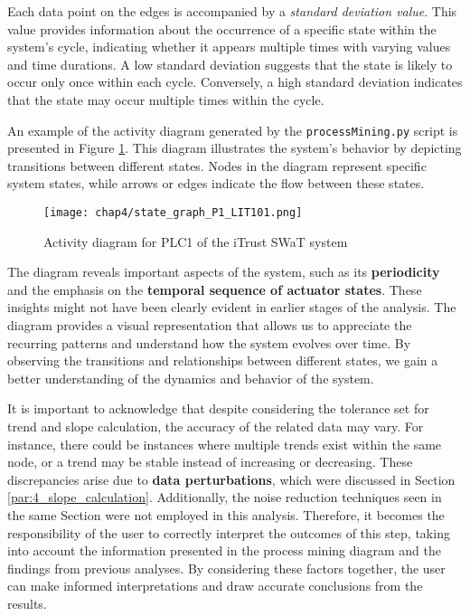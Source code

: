 Each data point on the edges is accompanied by a \textit{standard deviation value}. This value provides information about the occurrence of a specific state within the system's cycle, indicating whether it appears multiple times with varying values and time durations. A low standard deviation suggests that the state is likely to occur only once within each cycle. Conversely, a high standard deviation indicates that the state may occur multiple times within the cycle.

\bigskip
An example of the activity diagram generated by the \texttt{processMining.py} script is presented in Figure \ref{fig:4_process_mining_graph}. This diagram illustrates the system's behavior by depicting transitions between different states. Nodes in the diagram represent specific system states, while arrows or edges indicate the flow between these states.

\begin{figure}[ht]
	\centering
	\texttt{[image: chap4/state\_graph\_P1\_LIT101.png]}
	\caption{Activity diagram for PLC1 of the iTrust SWaT system}
	\label{fig:4_process_mining_graph}
\end{figure}

\noindent The diagram reveals important aspects of the system, such as its \textbf{periodicity} and the emphasis on the \textbf{temporal sequence of actuator states}. These insights might not have been clearly evident in earlier stages of the analysis. The diagram provides a visual representation that allows us to appreciate the recurring patterns and understand how the system evolves over time. By observing the transitions and relationships between different states, we gain a better understanding of the dynamics and behavior of the system.

\bigskip
It is important to acknowledge that despite considering the tolerance set for trend and slope calculation, the accuracy of the related data may vary. For instance, there could be instances where multiple trends exist within the same node, or a trend may be stable instead of increasing or decreasing. These discrepancies arise due to \textbf{data perturbations}, which were discussed in Section \ref{par:4_slope_calculation}. Additionally, the noise reduction techniques seen in the same Section were not employed in this analysis. Therefore, it becomes the responsibility of the user to correctly interpret the outcomes of this step, taking into account the information presented in the process mining diagram and the findings from previous analyses. By considering these factors together, the user can make informed interpretations and draw accurate conclusions from the results.

